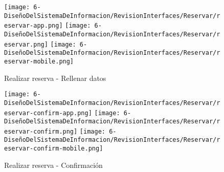 \begin{figure}[H]
	\centering
	\texttt{[image: 6-DiseñoDelSistemaDeInformacion/RevisionInterfaces/Reservar/reservar-app.png]}
	\texttt{[image: 6-DiseñoDelSistemaDeInformacion/RevisionInterfaces/Reservar/reservar.png]}
	\texttt{[image: 6-DiseñoDelSistemaDeInformacion/RevisionInterfaces/Reservar/reservar-mobile.png]}
	\caption{Realizar reserva - Rellenar datos}
\end{figure}

\begin{figure}[H]
	\centering
	\texttt{[image: 6-DiseñoDelSistemaDeInformacion/RevisionInterfaces/Reservar/reservar-confirm-app.png]}
	\texttt{[image: 6-DiseñoDelSistemaDeInformacion/RevisionInterfaces/Reservar/reservar-confirm.png]}
	\texttt{[image: 6-DiseñoDelSistemaDeInformacion/RevisionInterfaces/Reservar/reservar-confirm-mobile.png]}
	\caption{Realizar reserva - Confirmación}
\end{figure}